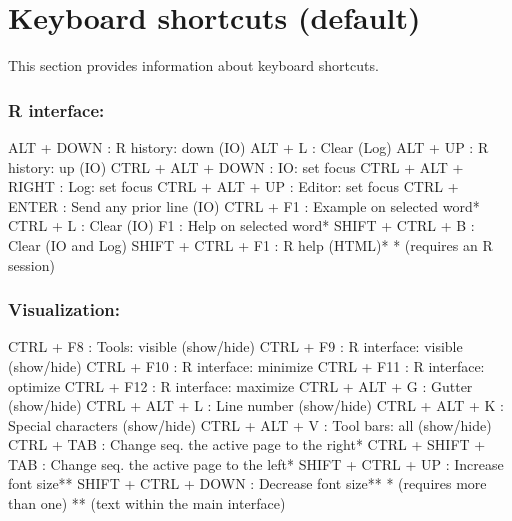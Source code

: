 
\hypertarget{basic_card}{}
\section{Keyboard shortcuts (default)}

This section provides information about keyboard shortcuts.

\hypertarget{basic_card_mostused}{}
\subsubsection{R interface:}

\vspace{-0.5cm}
\begin{Rtables}[caption={[R interface keyboard shortcuts]
    R interface keyboard shortcuts},
  label=hotkey:rinterface]
  ALT  + DOWN            : R history: down (IO)
  ALT  + L               : Clear (Log)
  ALT  + UP              : R history: up (IO)
  CTRL + ALT + DOWN      : IO: set focus
  CTRL + ALT + RIGHT     : Log: set focus
  CTRL + ALT + UP        : Editor: set focus
  CTRL + ENTER           : Send any prior line (IO)
  CTRL + F1              : Example on selected word*
  CTRL + L               : Clear (IO)
  F1                     : Help on selected word*
  SHIFT + CTRL + B       : Clear (IO and Log)
  SHIFT + CTRL + F1      : R help (HTML)*
  * (requires an R session)
\end{Rtables}


\subsubsection{Visualization:}

\vspace{-0.5cm}
\begin{Rtables}[caption={[Visualization keyboard shortcuts]
    Visualization keyboard shortcuts},
  label=hotkey:visualization]
  CTRL  + F8              : Tools: visible (show/hide)
  CTRL  + F9              : R interface: visible (show/hide)
  CTRL  + F10             : R interface: minimize
  CTRL  + F11             : R interface: optimize
  CTRL  + F12             : R interface: maximize
  CTRL  + ALT  + G        : Gutter (show/hide)
  CTRL  + ALT  + L        : Line number (show/hide)
  CTRL  + ALT  + K        : Special characters (show/hide)
  CTRL  + ALT  + V        : Tool bars: all (show/hide)
  CTRL  + TAB             : Change seq. the active page to the right*
  CTRL  + SHIFT + TAB     : Change seq. the active page to the left*
  SHIFT + CTRL + UP       : Increase font size**
  SHIFT + CTRL + DOWN     : Decrease font size**
  *  (requires more than one)
  ** (text within the main interface)
\end{Rtables}


